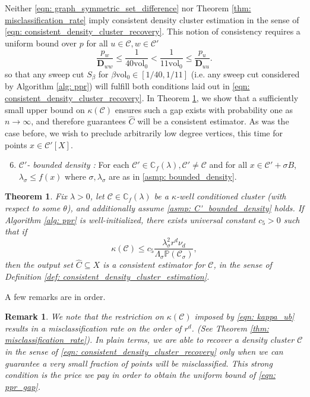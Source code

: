 \documentclass{article}
\newcommand{\vol}{\mathrm{vol}}
\newcommand{\1}{\mathbf{1}}
\newcommand{\pbf}{p}        %
\newcommand{\Xbf}{X}             %
\newcommand{\Dbf}{\mathbf{D}}
\newcommand{\Pbb}{\mathbb{P}}
\newcommand{\Cbb}{\mathbb{C}}
\newcommand{\Cset}{\mathcal{C}}
\newcommand{\Csig}{\Cset_{\sigma}}
\newcommand{\Cest}{\widehat{C}}
\theoremstyle{aldenthm}
\newtheorem{theorem}{Theorem}
\theoremstyle{aldenrmrk}
\newtheorem{remark}{Remark}
\begin{document}
Neither \eqref{eqn: graph_symmetric_set_difference} nor Theorem \ref{thm: misclassification_rate} imply consistent density cluster estimation in the sense of \eqref{eqn: consistent_density_cluster_recovery}. This notion of consistency requires a uniform bound over $\pbf$ for all $u \in \Cset, w \in \Cset'$
\begin{equation}
\label{eqn: ppr_gap}
\frac{p_{w}}{\Dbf_{ww}} \leq \frac{1}{40\vol_0} < \frac{1}{11\vol_0} \leq \frac{p_u}{\Dbf_{uu}}.
\end{equation}
so that any sweep cut $S_{\beta}$ for $\beta \vol_0 \in [1/40,1/11]$ (i.e. any sweep cut considered by Algorithm \ref{alg: ppr}) will fulfill both conditions laid out in \eqref{eqn: consistent_density_cluster_recovery}. In Theorem \ref{thm: consistent_recovery_of_density_clusters}, we show that a sufficiently small upper bound on $\kappa(\Cset)$ ensures such a gap exists with probability one as $n \to \infty$, and therefore guarantees $\Cest$ will be a consistent estimator. As was the case before, we wish to preclude arbitrarily low degree vertices, this time for points $x \in \Cset'[\Xbf]$.
\begin{enumerate}[label=(A\arabic*)]
	\setcounter{enumi}{5}
	\item 
	\label{asmp: C'_bounded_density}
	\emph{$\Cset'$- bounded density :} For each $\Cset' \in \Cbb_f(\lambda), \Cset' \neq \Cset$ and for all $x \in \Cset' + \sigma B$, $\lambda_{\sigma} \leq f(x)$ where $\sigma,\lambda_{\sigma}$ are as in \ref{asmp: bounded_density}.
\end{enumerate}

\begin{theorem}
	\label{thm: consistent_recovery_of_density_clusters}
	Fix $\lambda > 0$, let $\Cset \in \Cbb_f(\lambda)$ be a $\kappa$-well conditioned cluster (with respect to some $\theta$), and additionally assume \ref{asmp: C'_bounded_density} holds. If Algorithm \ref{alg: ppr} is well-initialized, there exists universal constant $c_5 > 0$ such that if
	\begin{equation}
	\label{eqn: kappa_ub}
	\kappa(\Cset) \leq c_5 \frac{\lambda_{\sigma}^2r^d \nu_d}{\Lambda_{\sigma}\Pbb(\Csig)},
	\end{equation}
	then the output set $\Cest \subseteq \Xbf$ is a consistent estimator for $\Cset$, in the sense of Definition \ref{def: consistent_density_cluster_estimation}.
\end{theorem}
A few remarks are in order.

\begin{remark}
	We note that the restriction on $\kappa(\Cset)$ imposed by \eqref{eqn: kappa_ub} results in a misclassification rate on the order of $r^d$. (See Theorem \ref{thm: misclassification_rate}). In plain terms, we are able to recover a density cluster $\Cset$ in the sense of \eqref{eqn: consistent_density_cluster_recovery} only when we can guarantee a very small fraction of points will be misclassified. This strong condition is the price we pay in order to obtain the uniform bound of \ref{eqn: ppr_gap}.
\end{remark}
\end{document}
